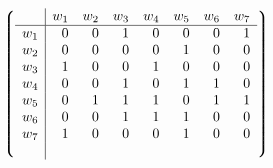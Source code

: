\documentclass[border=3pt]{standalone}
\begin{document}
 $\left\lgroup\begin{array}{r| r r r r r r r}
    & w_ 1     & w_2   & w_3 & w_4  &w_5 & w_6 & w_7    \\ 
 \hline
      w_1& 0 & 0  & 1 & 0&  0& 0& 1\\ 
     w_2& 0 & 0  & 0 & 0&  1& 0&0 \\ 
     w_3 & 1 & 0  & 0 & 1& 0& 0 &0\\ 
     w_4& 0 & 0  & 1 & 0& 1& 1 & 0\\ 
      w_5& 0 & 1  & 1 & 1& 0& 1 &1\\ 
       w_6& 0 & 0  & 1 & 1& 1& 0&0\\ 
        w_7& 1 & 0  & 0 &0& 1& 0&0\\ & 
 \end{array}\right\rgroup$ \\ \\
\end{document}
